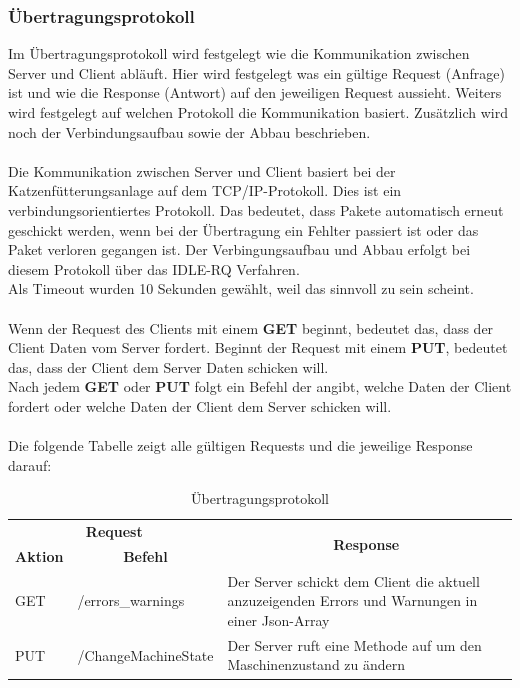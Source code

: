 \subsubsection{Übertragungsprotokoll}
Im Übertragungsprotokoll wird festgelegt wie die Kommunikation zwischen Server und Client abläuft. Hier wird festgelegt was ein gültige Request (Anfrage) ist und wie die Response (Antwort) auf den jeweiligen Request aussieht. Weiters wird festgelegt auf welchen Protokoll die Kommunikation basiert. Zusätzlich wird noch der Verbindungsaufbau sowie der Abbau beschrieben.
\\ \\
Die Kommunikation zwischen Server und Client basiert bei der Katzenfütterungsanlage auf dem TCP/IP-Protokoll. Dies ist ein verbindungsorientiertes Protokoll. Das bedeutet, dass Pakete automatisch erneut geschickt werden, wenn bei der Übertragung ein Fehlter passiert ist oder das Paket verloren gegangen ist. Der Verbingungsaufbau und Abbau erfolgt bei diesem Protokoll über das IDLE-RQ Verfahren.
\\ Als Timeout wurden 10 Sekunden gewählt, weil das sinnvoll zu sein scheint.
\\ \\
Wenn der Request des Clients mit einem \textbf{GET} beginnt, bedeutet das, dass der Client Daten vom Server fordert. Beginnt der Request mit einem \textbf{PUT}, bedeutet das, dass der Client dem Server Daten schicken will.
\\ Nach jedem \textbf{GET} oder \textbf{PUT} folgt ein Befehl der angibt, welche Daten der Client fordert oder welche Daten der Client dem Server schicken will.
\\ \\
Die folgende Tabelle zeigt alle gültigen Requests und die jeweilige Response darauf:

\begin{table}[htb]
\centering
\begin{tabular}{|l|l|p{300pt}|}
\hline
\multicolumn{2}{|c|}{\textbf{Request}}                                    & \multicolumn{1}{c|}{\multirow{2}{*}{\textbf{Response}}}                                          \\ \cline{1-2}
\multicolumn{1}{|c|}{\textbf{Aktion}} & \multicolumn{1}{c|}{\textbf{Befehl}} & \multicolumn{1}{c|}{}                                                                            \\ \hline
GET                                   & /errors\_warnings                 & Der Server schickt dem Client die aktuell anzuzeigenden Errors und Warnungen in einer Json-Array \\ \hline
PUT                                   & /ChangeMachineState               & Der Server ruft eine Methode auf um den Maschinenzustand zu ändern                               \\ \hline
\end{tabular}
\caption{Übertragungsprotokoll}
\label{Übertragungsprotokoll}
\end{table}


